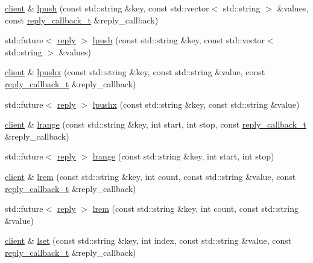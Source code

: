\begin{DoxyCompactItemize}
\item 
\hyperlink{classcpp__redis_1_1client}{client} \& \hyperlink{classcpp__redis_1_1client_a0dd04ea38709dd51ae5f39de62d01c70}{lpush} (const std\+::string \&key, const std\+::vector$<$ std\+::string $>$ \&values, const \hyperlink{classcpp__redis_1_1client_a061a1140d36d2eaeda82b09a0bb3f9f2}{reply\+\_\+callback\+\_\+t} \&reply\+\_\+callback)
\item 
std\+::future$<$ \hyperlink{classcpp__redis_1_1reply}{reply} $>$ \hyperlink{classcpp__redis_1_1client_ac5859a6b63200a4a79574187a7155feb}{lpush} (const std\+::string \&key, const std\+::vector$<$ std\+::string $>$ \&values)
\item 
\hyperlink{classcpp__redis_1_1client}{client} \& \hyperlink{classcpp__redis_1_1client_ab0a9a2b92f53f774ce4e345b42a403d0}{lpushx} (const std\+::string \&key, const std\+::string \&value, const \hyperlink{classcpp__redis_1_1client_a061a1140d36d2eaeda82b09a0bb3f9f2}{reply\+\_\+callback\+\_\+t} \&reply\+\_\+callback)
\item 
std\+::future$<$ \hyperlink{classcpp__redis_1_1reply}{reply} $>$ \hyperlink{classcpp__redis_1_1client_af9a3e05f5bd6d4ebb3138dc09f8d0d4e}{lpushx} (const std\+::string \&key, const std\+::string \&value)
\item 
\hyperlink{classcpp__redis_1_1client}{client} \& \hyperlink{classcpp__redis_1_1client_a9e85cce8555274f7bc706a13911b4579}{lrange} (const std\+::string \&key, int start, int stop, const \hyperlink{classcpp__redis_1_1client_a061a1140d36d2eaeda82b09a0bb3f9f2}{reply\+\_\+callback\+\_\+t} \&reply\+\_\+callback)
\item 
std\+::future$<$ \hyperlink{classcpp__redis_1_1reply}{reply} $>$ \hyperlink{classcpp__redis_1_1client_a1e7c8d099459af438cc4ed215afef066}{lrange} (const std\+::string \&key, int start, int stop)
\item 
\hyperlink{classcpp__redis_1_1client}{client} \& \hyperlink{classcpp__redis_1_1client_a26d934d6fd06503d8727969be5ebb043}{lrem} (const std\+::string \&key, int count, const std\+::string \&value, const \hyperlink{classcpp__redis_1_1client_a061a1140d36d2eaeda82b09a0bb3f9f2}{reply\+\_\+callback\+\_\+t} \&reply\+\_\+callback)
\item 
std\+::future$<$ \hyperlink{classcpp__redis_1_1reply}{reply} $>$ \hyperlink{classcpp__redis_1_1client_a6581856beb86e871feb42d703cd1824a}{lrem} (const std\+::string \&key, int count, const std\+::string \&value)
\item 
\hyperlink{classcpp__redis_1_1client}{client} \& \hyperlink{classcpp__redis_1_1client_a98e469104f97332c785d4c2f3d15150e}{lset} (const std\+::string \&key, int index, const std\+::string \&value, const \hyperlink{classcpp__redis_1_1client_a061a1140d36d2eaeda82b09a0bb3f9f2}{reply\+\_\+callback\+\_\+t} \&reply\+\_\+callback)

\end{DoxyCompactItemize}
